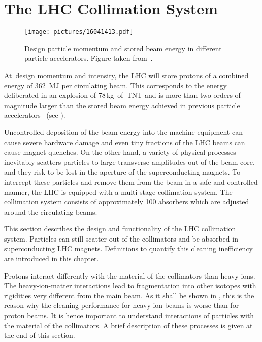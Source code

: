 \section{The LHC Collimation System}\label{chap:3}
%
\begin{figure}[b]  
    \centering
    \texttt{[image: pictures/16041413.pdf]}
    \caption{Design particle momentum and stored beam energy in different particle accelerators. Figure taken from~\cite{collimationsystemref1}.}  
    \label{pic:16041401}
\end{figure}
%
\mbox{At design} momentum and intensity, the LHC will store protons of a combined energy of 362~MJ per circulating beam. This corresponds to the energy deliberated in an explosion of \mbox{78\,kg of TNT} and is more than two orders of magnitude larger than the stored beam energy achieved in previous particle accelerators~\cite{CERN-2004-003-V1,collimationsystemref1}  (see ). 

Uncontrolled deposition of the beam energy into the machine equipment can cause severe hardware damage and even tiny fractions of the LHC beams can cause magnet quenches. On the other hand, a variety of physical processes inevitably scatters particles to large transverse amplitudes out of the beam core, and they risk to be lost in the aperture of the superconducting magnets. To intercept these particles and remove them from the beam in a safe and controlled manner, the LHC is equipped with a multi-stage collimation system. The collimation system consists of approximately 100 absorbers which are adjusted around the circulating beams. 

This section describes the design and functionality of the LHC collimation system. Particles can still scatter out of the collimators and be absorbed in superconducting LHC magnets. Definitions to quantify this cleaning inefficiency are introduced in this chapter. 

Protons interact differently with the material of the collimators than heavy ions. The heavy-ion-matter interactions lead to fragmentation into other isotopes with rigidities very different from the main beam. As it shall be shown in , this is the reason why the cleaning performance for heavy-ion beams is worse than for proton beams. It is hence important to understand interactions of particles with the material of the collimators. A brief description of these processes is given at the end of this section.



